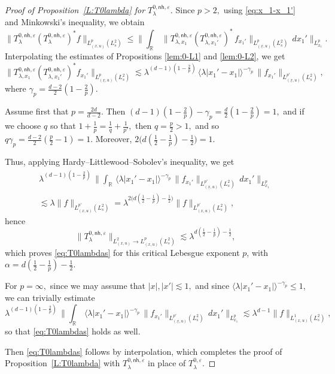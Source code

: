 \documentclass[leqno]{amsart}
\theoremstyle{definition}
\theoremstyle{remark}
\numberwithin{equation}{section}
\newcommand{\R}{\mathbb{R}}
\begin{document}
\begin{proof}[Proof of Proposition~\ref{L:T0lambda} for $T_\lambda^{0,\mathsf{nh},\varepsilon}$]
Since $p> 2,$ using \eqref{eq:x_1-x_1'} and  Minkowski's inequality, we obtain
\[
\|T_\lambda^{0,\mathsf{nh},\varepsilon} (T_\lambda^{0,\mathsf{nh},\varepsilon})^* f\|_{L_{(x,u)}^p(L_s^2)}
 \le \Big\| \int_\R \, \big\| T_{\lambda,x_1}^{0,\mathsf{nh},\varepsilon} (T_{\lambda,x_1'}^{0,\mathsf{nh},\varepsilon} )^* \, f_{x_1'} \big\|_{L_{(\underline x,u)}^p(L_s^2)} \, dx_1' \Big \|_{L_{x_1}^p}.
\]
Interpolating the estimates of Propositions \ref{lem:0-L1} and \ref{lem:0-L2}, we get
\[
\|T_{\lambda,x_1}^{0,\mathsf{nh},\varepsilon} (T_{\lambda,x_1'}^{0,\mathsf{nh},\varepsilon} )^* f_{x_1'}\|_{L_{(\underline x,u)}^p(L^2_s)}
\lesssim \lambda^{(d-1)(1-\frac 2 p)} \, \langle\lambda\left|x_1'-x_1\right|\rangle^{-\gamma_p} \, \|f_{x_1'}\|_{L_{(\underline x,u)}^{p'}(L^2_s)},
\]
where $\gamma_p = \frac{d-2}2 (1-\frac 2 p)$. 

Assume first that $p = \frac{2d}{d-2}.$ Then $(d-1)(1-\frac 2 p)-\gamma_p =\frac d2(1-\frac 2 p)=1,$  and if we choose $q$ so that  $1+\frac 1p=\frac 1q+\frac 1{p'},$ then $q=\frac p 2>1,$ and so $q\gamma_p =\frac{d-2}2 (\frac p2-1)=1.$ Moreover,
$2\big(d(\frac 12 -\frac 1p)-\frac 12\big)=1.$

Thus, applying Hardy--Littlewood--Sobolev's inequality, we get
\begin{multline*}
\lambda^{(d-1)(1-\frac 2 p)} \, \Big\| \int_\R \, \langle\lambda\left|x_1'-x_1\right|\rangle^{-\gamma_p} \, \|f_{x_1'}\|_{L_{(\underline x,u)}^{p'}(L^2_s)} \, dx_1' \Big \|_{L_{x_1}^p} \\
 \lesssim \lambda \|f\|_{L_{(x,u)}^{p'}(L^2_s)}=\lambda^{2\big(d(\frac 12 -\frac 1p)-\frac 12\big)} \|f\|_{L_{(x,u)}^{p'}(L^2_s)},
\end{multline*}
hence
\[
\| T_\lambda^{0,\mathsf{nh},\varepsilon} \|_{L_{(x,u)}^2 \to L_{(x,u)}^p(L^2_s) } \lesssim \lambda^{d(\frac 12 -\frac 1p)-\frac 12},
\]
which proves \eqref{eq:T0lambdas} for this critical Lebesgue exponent $p$, with $\alpha=d(\frac 12 -\frac 1p)-\frac 12.$ 

For $p=\infty,$ since we may assume that $|x|,|x'|\lesssim 1,$ and since $\langle\lambda\left|x_1'-x_1\right|\rangle^{-\gamma_p}\le 1$, we can trivially estimate 
$$\lambda^{(d-1)(1-\frac 2 p)} \, \Big\| \int_\R \, \langle\lambda\left|x_1'-x_1\right|\rangle^{-\gamma_p} \, \|f_{x_1'}\|_{L_{(\underline x,u)}^{p'}(L^2_s)} \, dx_1' \Big \|_{L_{x_1}^p}\lesssim \lambda^{d-1} \|f\|_{L_{(x,u)}^{1}(L^2_s)},
$$
so that \eqref{eq:T0lambdas}  holds as well. 

Then \eqref{eq:T0lambdas} follows by interpolation, which completes the proof of Proposition~\ref{L:T0lambda} with $T_\lambda^{0,\mathsf{nh},\varepsilon}$ in place of $T_\lambda^{0,\varepsilon}$.  
\end{proof}
\end{document}
